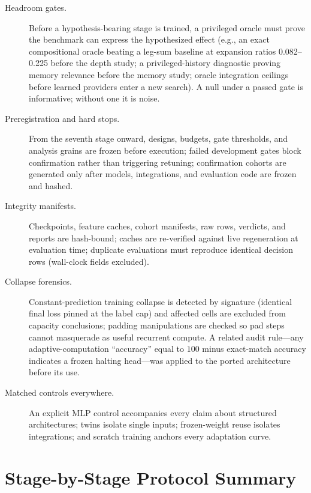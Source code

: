 \documentclass[11pt,letterpaper]{article}
\begin{document}
\begin{description}
  \item[Headroom gates.] Before a hypothesis-bearing stage is trained, a privileged oracle must prove the benchmark can express the hypothesized effect (e.g., an exact compositional oracle beating a leg-sum baseline at expansion ratios 0.082--0.225 before the depth study; a privileged-history diagnostic proving memory relevance before the memory study; oracle integration ceilings before learned providers enter a new search). A null under a passed gate is informative; without one it is noise.
  \item[Preregistration and hard stops.] From the seventh stage onward, designs, budgets, gate thresholds, and analysis grains are frozen before execution; failed development gates block confirmation rather than triggering retuning; confirmation cohorts are generated only after models, integrations, and evaluation code are frozen and hashed.
  \item[Integrity manifests.] Checkpoints, feature caches, cohort manifests, raw rows, verdicts, and reports are hash-bound; caches are re-verified against live regeneration at evaluation time; duplicate evaluations must reproduce identical decision rows (wall-clock fields excluded).
  \item[Collapse forensics.] Constant-prediction training collapse is detected by signature (identical final loss pinned at the label cap) and affected cells are excluded from capacity conclusions; padding manipulations are checked so pad steps cannot masquerade as useful recurrent compute. A related audit rule---any adaptive-computation ``accuracy'' equal to $100$ minus exact-match accuracy indicates a frozen halting head---was applied to the ported architecture before its use.
  \item[Matched controls everywhere.] An explicit MLP control accompanies every claim about structured architectures; twins isolate single inputs; frozen-weight reuse isolates integrations; and scratch training anchors every adaptation curve.
\end{description}

\section{Stage-by-Stage Protocol Summary}
\end{document}
